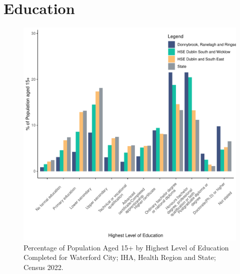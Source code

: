\documentclass{article}
\begin{document}
\section{Education}\label{sect:Edu}
\begin{figure}[H]
	\centering
	\includegraphics[width = 120mm]{../figures/EduED.pdf}
	\caption{Percentage of Population Aged 15+ by Highest Level of Education Completed for Waterford City; IHA, Health Region and State; Census 2022.}
	\label{fig:vbnv}
	\end{figure}
\end{document}
